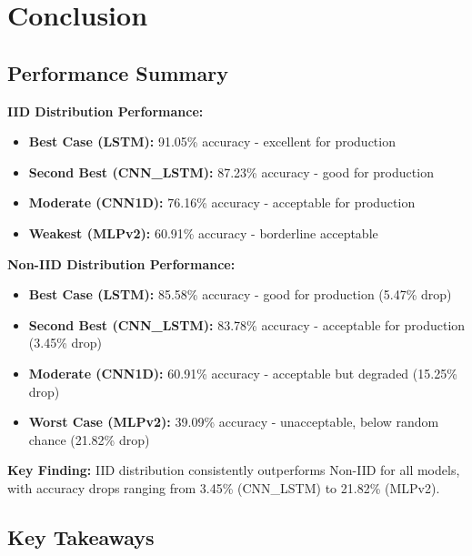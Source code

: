 \documentclass[12pt,a4paper]{article}
\begin{document}
\section{Conclusion}

\subsection{Performance Summary}

\textbf{IID Distribution Performance:}
\begin{itemize}
    \item \textbf{Best Case (LSTM):} 91.05\% accuracy - excellent for production
    \item \textbf{Second Best (CNN\_LSTM):} 87.23\% accuracy - good for production
    \item \textbf{Moderate (CNN1D):} 76.16\% accuracy - acceptable for production
    \item \textbf{Weakest (MLPv2):} 60.91\% accuracy - borderline acceptable
\end{itemize}

\textbf{Non-IID Distribution Performance:}
\begin{itemize}
    \item \textbf{Best Case (LSTM):} 85.58\% accuracy - good for production (5.47\% drop)
    \item \textbf{Second Best (CNN\_LSTM):} 83.78\% accuracy - acceptable for production (3.45\% drop)
    \item \textbf{Moderate (CNN1D):} 60.91\% accuracy - acceptable but degraded (15.25\% drop)
    \item \textbf{Worst Case (MLPv2):} 39.09\% accuracy - unacceptable, below random chance (21.82\% drop)
\end{itemize}

\textbf{Key Finding:} IID distribution consistently outperforms Non-IID for all models, with accuracy drops ranging from 3.45\% (CNN\_LSTM) to 21.82\% (MLPv2).

\subsection{Key Takeaways}
\end{document}
